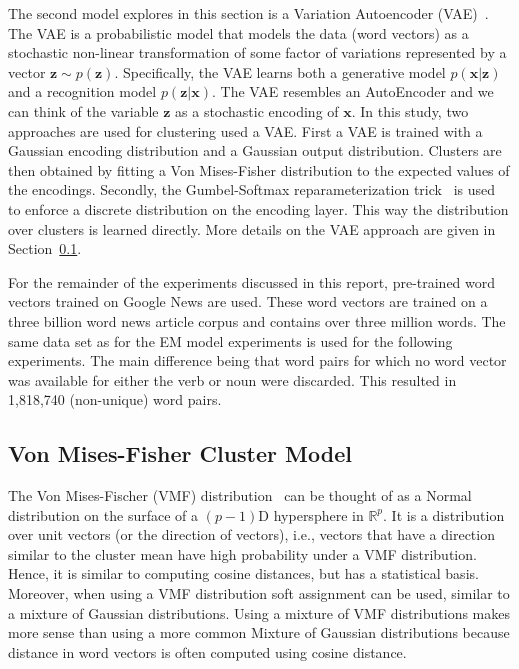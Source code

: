 \documentclass[11pt]{scrartcl}
\newcommand{\bx}{\boldsymbol{x}}
\newcommand{\bz}{\boldsymbol{z}}
\begin{document}
The second model explores in this section is a Variation Autoencoder
(VAE)~\cite{kingma2013auto, rezende2014stochastic}. The VAE is a
probabilistic model that models the data (word vectors) as a
stochastic non-linear transformation of some factor of variations
represented by a vector $\boldsymbol{z} \sim
p(\boldsymbol{z})$. Specifically, the VAE learns both a generative
model $p(\bx|\bz)$ and a recognition model $p(\bz|\bx)$. The VAE
resembles an AutoEncoder and we can think of the variable $\bz$ as a
stochastic encoding of $\bx$. In this study, two approaches are used
for clustering used a VAE\@. First a VAE is trained with a Gaussian
encoding distribution and a Gaussian output distribution. Clusters are
then obtained by fitting a Von Mises-Fisher distribution to the
expected values of the encodings. Secondly, the Gumbel-Softmax
reparameterization trick~\cite{jang2016categorical,
maddison2016concrete} is used to enforce a discrete distribution on
the encoding layer. This way the distribution over clusters is learned
directly. More details on the VAE approach are given in
Section~\ref{sec:vmf}.

For the remainder of the experiments discussed in this report,
pre-trained word vectors trained on Google News are used. These word
vectors are trained on a three billion word news article corpus and
contains over three million words. The same data set as for the EM
model experiments is used for the following experiments. The main
difference being that word pairs for which no word vector was
available for either the verb or noun were discarded.  This resulted
in 1,818,740 (non-unique) word pairs.

\subsection{Von Mises-Fisher Cluster Model}
\label{sec:vmf}
The Von Mises-Fischer (VMF) distribution~\cite{mardia2009directional}
can be thought of as a Normal distribution on the surface of a
$(p-1)$D hypersphere in $\mathbb{R}^p$. It is a distribution over unit
vectors (or the direction of vectors), i.e., vectors that have a
direction similar to the cluster mean have high probability under a
VMF distribution. Hence, it is similar to computing cosine distances,
but has a statistical basis. Moreover, when using a VMF distribution soft
assignment can be used, similar to a mixture of Gaussian
distributions. Using a mixture of VMF distributions makes more sense
than using a more common Mixture of Gaussian distributions because
distance in word vectors is often computed using cosine distance.
\end{document}
